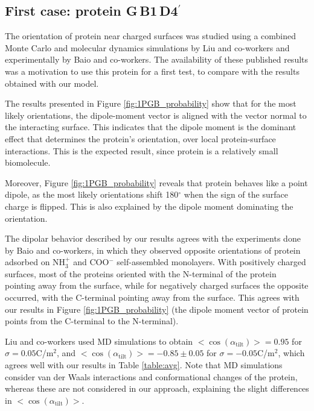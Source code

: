 
\subsection{First case: protein G\,B1\,D4$^\prime$} \label{sec:disc_1PGB}

The orientation of protein \gb near charged surfaces was studied using a combined Monte Carlo and molecular dynamics simulations by Liu and co-workers\cite{LiuLiaoZhou2013} and experimentally by Baio and co-workers.\cite{BaioWeidnerBaughGambleStaytonCastner2012} The availability of these published results was a motivation to use this protein for a first test, to compare with the results obtained with our model. 

The results presented in Figure \ref{fig:1PGB_probability} show that for the most likely orientations, the dipole-moment vector is aligned with the vector normal to the interacting surface. This indicates that the dipole moment is the dominant effect that determines the protein's orientation, over local protein-surface  interactions. This is the expected result, since protein \gb is a relatively small biomolecule. 

Moreover, Figure \ref{fig:1PGB_probability} reveals that protein \gb behaves like a point dipole, as the most likely orientations shift 180$^\circ$ when the sign of the surface charge is flipped. This is also explained by the dipole moment dominating the orientation.

The dipolar behavior described by our results agrees with the experiments done by Baio and co-workers, \cite{BaioWeidnerBaughGambleStaytonCastner2012} in which they observed opposite orientations of protein \gb adsorbed on NH$_3^+$ and COO$^-$ self-assembled monolayers. With positively charged surfaces, most of the proteins oriented with the N-terminal of the protein pointing away from the surface, while for negatively charged surfaces the opposite occurred, with the C-terminal pointing away from the surface. This agrees with our results in Figure \ref{fig:1PGB_probability} (the dipole moment vector of protein \gb points from the C-terminal to the N-terminal).

Liu and co-workers \cite{LiuLiaoZhou2013} used MD simulations to obtain $<\cos(\alpha_{\text{tilt}})>=0.95$ for $\sigma = 0.05$C/m$^2$, and $<\cos(\alpha_{\text{tilt}})>=-0.85\pm0.05$ for $\sigma = -0.05$C/m$^2$, which agrees well with our results in Table \ref{table:avg}. Note that MD simulations consider van der Waals interactions and conformational changes of the protein, whereas these are not considered in our approach, explaining the slight differences in $<\cos(\alpha_{\text{tilt}})>$.

